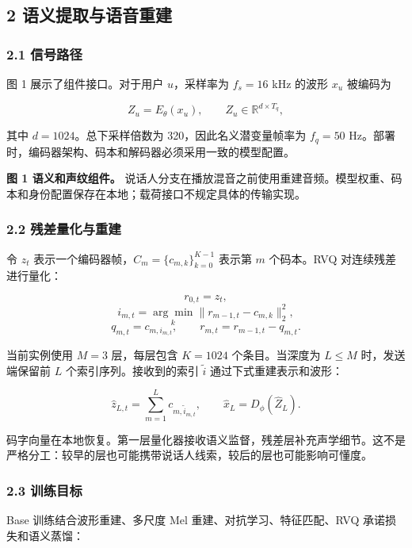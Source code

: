 \documentclass[12pt]{article}
\begin{document}
\subsection{2
语义提取与语音重建}\label{ux8bedux4e49ux63d0ux53d6ux4e0eux8bedux97f3ux91cdux5efa}

\subsubsection{2.1 信号路径}\label{ux4fe1ux53f7ux8defux5f84}

图 1 展示了组件接口。对于用户 \(u\)，采样率为 \(f_s=16\) kHz 的波形
\(x_u\) 被编码为

\[
Z_u=E_\theta(x_u),\qquad Z_u\in\mathbb{R}^{d\times T_q},
\]

其中 \(d=1024\)。总下采样倍数为 320，因此名义潜变量帧率为 \(f_q=50\)
Hz。部署时，编码器架构、码本和解码器必须采用一致的模型配置。

\textbf{图 1 语义和声纹组件。}
说话人分支在播放混音之前使用重建音频。模型权重、码本和身份配置保存在本地；载荷接口不规定具体的传输实现。

\subsubsection{2.2
残差量化与重建}\label{ux6b8bux5deeux91cfux5316ux4e0eux91cdux5efa}

令 \(z_t\) 表示一个编码器帧，\(C_m=\{c_{m,k}\}_{k=0}^{K-1}\) 表示第
\(m\) 个码本。RVQ 对连续残差进行量化：

\[
r_{0,t}=z_t,
\] \[
i_{m,t}=\underset{k}{\arg\min}\|r_{m-1,t}-c_{m,k}\|_2^2,
\] \[
q_{m,t}=c_{m,i_{m,t}},\qquad r_{m,t}=r_{m-1,t}-q_{m,t}.
\]

当前实例使用 \(M=3\) 层，每层包含 \(K=1024\) 个条目。当深度为
\(L\leq M\) 时，发送端保留前 \(L\) 个索引序列。接收到的索引
\(\widetilde i\) 通过下式重建表示和波形：

\[
\hat z_{L,t}=\sum_{m=1}^{L}c_{m,\widetilde i_{m,t}},\qquad
\hat x_L=D_\phi(\hat Z_L).
\]

码字向量在本地恢复。第一层量化器接收语义监督，残差层补充声学细节。这不是严格分工：较早的层也可能携带说话人线索，较后的层也可能影响可懂度。

\subsubsection{2.3 训练目标}\label{ux8badux7ec3ux76eeux6807}

Base 训练结合波形重建、多尺度 Mel 重建、对抗学习、特征匹配、RVQ
承诺损失和语义蒸馏：
\end{document}
